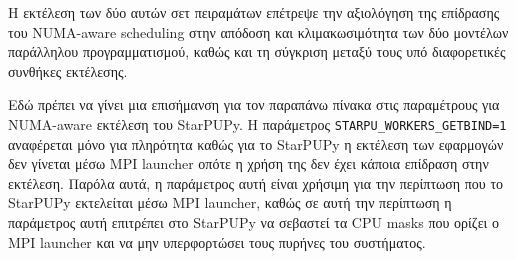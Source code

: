 Η εκτέλεση των δύο αυτών σετ πειραμάτων επέτρεψε την αξιολόγηση της επίδρασης του NUMA-aware scheduling στην απόδοση και κλιμακωσιμότητα των δύο μοντέλων παράλληλου προγραμματισμού, καθώς και τη σύγκριση μεταξύ τους υπό διαφορετικές συνθήκες εκτέλεσης.

Εδώ πρέπει να γίνει μια επισήμανση για τον παραπάνω πίνακα στις παραμέτρους για NUMA-aware εκτέλεση του StarPUPy. Η παράμετρος \texttt{STARPU\_WORKERS\_GETBIND=1} αναφέρεται μόνο για πληρότητα καθώς για το StarPUPy η εκτέλεση των εφαρμογών δεν γίνεται μέσω MPI launcher οπότε η χρήση της δεν έχει κάποια επίδραση στην εκτέλεση. Παρόλα αυτά, η παράμετρος αυτή είναι χρήσιμη για την περίπτωση που το StarPUPy εκτελείται μέσω MPI launcher, καθώς σε αυτή την περίπτωση η παράμετρος αυτή επιτρέπει στο StarPUPy να σεβαστεί τα CPU masks που ορίζει ο MPI launcher και να μην υπερφορτώσει τους πυρήνες του συστήματος. 

